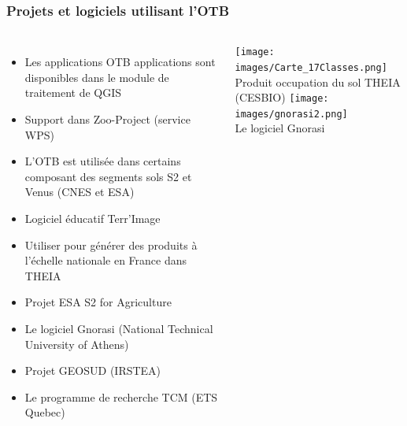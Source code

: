 \documentclass[8pt]{beamer}
\begin{document}
\begin{frame}
  \frametitle{Projets et logiciels utilisant l'OTB}
  \vspace{-0.5cm}
\begin{columns}
  \begin{itemize}
    \item Les applications OTB applications sont disponibles dans le module de traitement de QGIS
    \item Support dans Zoo-Project (service WPS)
    \item L'OTB est utilisée dans certains composant des segments sols S2 et
      Venus (CNES et ESA)
    \item Logiciel éducatif Terr'Image
    \item Utiliser pour générer des produits à l'échelle nationale en France
      dans THEIA
    \item Projet ESA S2 for Agriculture
    \item Le logiciel Gnorasi (National Technical University of Athens)
    \item Projet GEOSUD (IRSTEA)
    \item Le programme de recherche TCM (ETS Quebec)
  \end{itemize}
\begin{center}
  \texttt{[image: images/Carte\_17Classes.png]}\\
  \tiny{Produit occupation du sol THEIA (CESBIO)}
  \texttt{[image: images/gnorasi2.png]}\\
  \tiny{Le logiciel Gnorasi}
\end{center}
\end{columns}
\end{frame}
\end{document}
